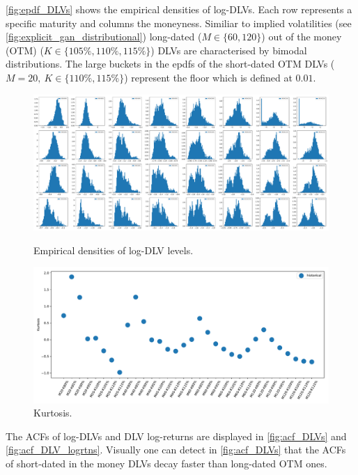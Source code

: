 \documentclass[]{article} %
\begin{document}
\autoref{fig:epdf_DLVs} shows the empirical densities of log-DLVs. Each row represents a specific maturity and columns the moneyness. Similiar to implied volatilities (see \autoref{fig:explicit_gan_distributional}) long-dated ($M \in \lbrace 60, 120 \rbrace$) out of the money (OTM) ($K \in \{105\%, 110\%, 115\%\}$) DLVs are characterised by bimodal distributions. The large buckets in the epdfs of the short-dated OTM DLVs ($M =20, \ K \in \lbrace 110\%, 115\%\rbrace$) represent the floor which is defined at $0.01$.

\begin{figure}[!htb]
    \centering
    \begin{minipage}{.45\textwidth}
        \centering
        \includegraphics[width=\textwidth]{figures/dlvs/distributional.pdf}
        \caption{Empirical densities of log-DLV levels.}
        \label{fig:epdf_DLVs}
    \end{minipage}%
	\hfill
    \begin{minipage}{.45\textwidth}
        \centering
        \includegraphics[width=\textwidth]{figures/dlvs/kurtosis.pdf}
        \caption{Kurtosis.}
        \label{fig:kurtosis_DLVs}
    \end{minipage}
\end{figure}

The ACFs of log-DLVs and DLV log-returns are displayed in \autoref{fig:acf_DLVs} and \autoref{fig:acf_DLV_logrtns}. Visually one can detect in \autoref{fig:acf_DLVs} that the ACFs of short-dated in the money DLVs decay faster than long-dated OTM ones.
\end{document}
